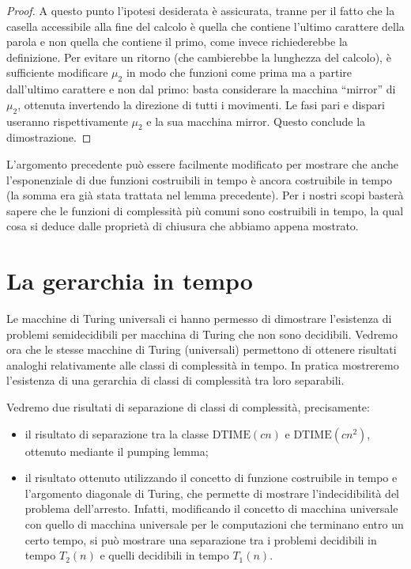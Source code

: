 \begin{proof}
A questo punto l'ipotesi desiderata è assicurata, tranne per il fatto che la casella accessibile alla fine del calcolo è quella che contiene l'ultimo carattere della parola e non quella che contiene il primo, come invece richiederebbe la definizione. Per evitare un ritorno (che cambierebbe la lunghezza del calcolo), è sufficiente modificare $\mu_2$ in modo che funzioni come prima ma a partire dall'ultimo carattere e non dal primo: basta considerare la macchina ``mirror'' di $\mu_2$, ottenuta invertendo la direzione di tutti i movimenti. Le fasi pari e dispari useranno rispettivamente $\mu_2$ e la sua macchina mirror. Questo conclude la dimostrazione.
\end{proof}

L'argomento precedente può essere facilmente modificato per mostrare che anche l'esponenziale di due funzioni costruibili in tempo è ancora costruibile in tempo (la somma era già stata trattata nel lemma precedente). Per i nostri scopi basterà sapere che le funzioni di complessità più comuni sono costruibili in tempo, la qual cosa si deduce dalle proprietà di chiusura che abbiamo appena mostrato.

\section{La gerarchia in tempo}

Le macchine di Turing universali ci hanno permesso di dimostrare l'esistenza di problemi semidecidibili per macchina di Turing che non sono decidibili. Vedremo ora che le stesse macchine di Turing (universali) permettono di ottenere risultati analoghi relativamente alle classi di complessità in tempo. In pratica mostreremo l'esistenza di una gerarchia di classi di complessità tra loro separabili.

Vedremo due risultati di separazione di classi di complessità, precisamente:
\begin{itemize}
\item il risultato di separazione tra la classe $\mathrm{DTIME}(cn)$ e $\mathrm{DTIME}(cn^2)$, ottenuto mediante il pumping lemma;
\item il risultato ottenuto utilizzando il concetto di funzione costruibile in tempo e l'argomento diagonale di Turing, che permette di mostrare l'indecidibilità del problema dell'arresto. Infatti, modificando il concetto di macchina universale con quello di macchina universale per le computazioni che terminano entro un certo tempo, si può mostrare una separazione tra i problemi decidibili in tempo $T_2(n)$ e quelli decidibili in tempo $T_1(n)$.
\end{itemize}

